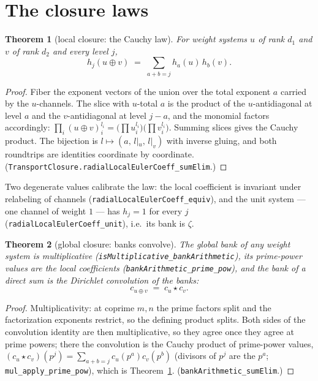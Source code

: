 \documentclass[11pt]{article}
\newtheorem{theorem}{Theorem}
\begin{document}
\section{The closure laws}

\begin{theorem}[local closure: the Cauchy law]\label{thm:cauchy}
For weight systems $u$ of rank $d_1$ and $v$ of rank $d_2$ and every level $j$,
\[
  h_j(u\oplus v)\;=\;\sum_{a+b=j}h_a(u)\,h_b(v).
\]
\end{theorem}
\begin{proof}
Fiber the exponent vectors of the union over the total exponent $a$ carried by the
$u$-channels.  The slice with $u$-total $a$ is the product of the $u$-antidiagonal at level
$a$ and the $v$-antidiagonal at level $j-a$, and the monomial factors accordingly:
$\prod_{i}(u\oplus v)_i^{l_i}=\bigl(\prod u_i^{l_i}\bigr)\bigl(\prod v_i^{l_i}\bigr)$.
Summing slices gives the Cauchy product.  The bijection is
$l\mapsto(a,\,l|_u,\,l|_v)$ with inverse gluing, and both roundtrips are identities
coordinate by coordinate.  (\texttt{TransportClosure.radialLocalEulerCoeff\_sumElim}.)
\end{proof}

Two degenerate values calibrate the law: the local coefficient is invariant under relabeling
of channels (\texttt{radialLocalEulerCoeff\_equiv}), and the unit system --- one channel of
weight $1$ --- has $h_j=1$ for every $j$ (\texttt{radialLocalEulerCoeff\_unit}), i.e.\ its bank
is $\zeta$.

\begin{theorem}[global closure: banks convolve]\label{thm:bank}
The global bank of any weight system is multiplicative
(\textup{\texttt{isMultiplicative\_bankArithmetic}}), its prime-power values are the local
coefficients (\textup{\texttt{bankArithmetic\_prime\_pow}}), and the bank of a direct sum is
the Dirichlet convolution of the banks:
\[
  c_{u\oplus v}\;=\;c_u\star c_v .
\]
\end{theorem}
\begin{proof}
Multiplicativity: at coprime $m,n$ the prime factors split and the factorization exponents
restrict, so the defining product splits.  Both sides of the convolution identity are then
multiplicative, so they agree once they agree at prime powers; there the convolution is the
Cauchy product of prime-power values, $(c_u\star c_v)(p^j)=\sum_{a+b=j}c_u(p^a)c_v(p^b)$
(divisors of $p^j$ are the $p^a$; \texttt{mul\_apply\_prime\_pow}), which is
Theorem~\ref{thm:cauchy}.  (\texttt{bankArithmetic\_sumElim}.)
\end{proof}
\end{document}
